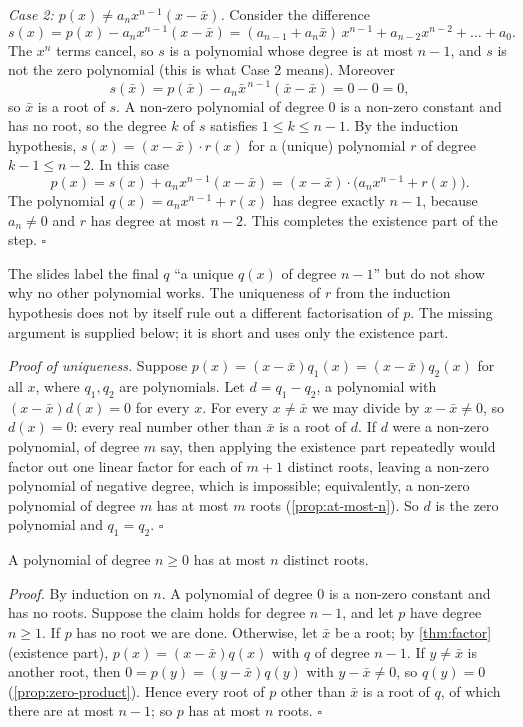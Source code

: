 \emph{Case 2: $p(x)\ne a_nx^{n-1}(x-\bar x)$.} Consider the difference
\[
s(x)=p(x)-a_nx^{n-1}(x-\bar x)=(a_{n-1}+a_n\bar x)\,x^{n-1}+a_{n-2}x^{n-2}+\dots+a_0.
\]
The $x^n$ terms cancel, so $s$ is a polynomial whose degree is at most $n-1$, and $s$ is not the zero polynomial (this is
what Case 2 means). Moreover
\[
s(\bar x)=p(\bar x)-a_n\bar x^{\,n-1}(\bar x-\bar x)=0-0=0,
\]
so $\bar x$ is a root of $s$. A non-zero polynomial of degree $0$ is a non-zero constant and has no root, so the degree
$k$ of $s$ satisfies $1\le k\le n-1$. By the induction hypothesis, $s(x)=(x-\bar x)\cdot r(x)$ for a (unique) polynomial
$r$ of degree $k-1\le n-2$. In this case
\[
p(x)=s(x)+a_nx^{n-1}(x-\bar x)=(x-\bar x)\cdot\big(a_nx^{n-1}+r(x)\big).
\]
The polynomial $q(x)=a_nx^{n-1}+r(x)$ has degree exactly $n-1$, because $a_n\ne0$ and $r$ has degree at most $n-2$. This
completes the existence part of the step. \hfill$\square$

\begin{sourcenote}
The slides label the final $q$ ``a unique $q(x)$ of degree $n-1$'' but do not show why no other polynomial works. The
uniqueness of $r$ from the induction hypothesis does not by itself rule out a different factorisation of $p$. The missing
argument is supplied below; it is short and uses only the existence part.
\end{sourcenote}

\emph{Proof of uniqueness.} Suppose $p(x)=(x-\bar x)q_1(x)=(x-\bar x)q_2(x)$ for all $x$, where $q_1,q_2$ are polynomials.
Let $d=q_1-q_2$, a polynomial with $(x-\bar x)d(x)=0$ for every $x$. For every $x\ne\bar x$ we may divide by $x-\bar x\ne0$,
so $d(x)=0$: every real number other than $\bar x$ is a root of $d$. If $d$ were a non-zero polynomial, of degree $m$ say,
then applying the existence part repeatedly would factor out one linear factor for each of $m+1$ distinct roots, leaving a
non-zero polynomial of negative degree, which is impossible; equivalently, a non-zero polynomial of degree $m$ has at most
$m$ roots (\cref{prop:at-most-n}). So $d$ is the zero polynomial and $q_1=q_2$. \hfill$\square$

\begin{proposition}
A polynomial of degree $n\ge0$ has at most $n$ distinct roots.
\end{proposition}
\emph{Proof.} By induction on $n$. A polynomial of degree $0$ is a non-zero constant and has no roots. Suppose the claim holds
for degree $n-1$, and let $p$ have degree $n\ge1$. If $p$ has no root we are done. Otherwise, let $\bar x$ be a root; by
\cref{thm:factor} (existence part), $p(x)=(x-\bar x)q(x)$ with $q$ of degree $n-1$. If $y\ne\bar x$ is another root, then
$0=p(y)=(y-\bar x)q(y)$ with $y-\bar x\ne0$, so $q(y)=0$ (\cref{prop:zero-product}). Hence every root of $p$ other than
$\bar x$ is a root of $q$, of which there are at most $n-1$; so $p$ has at most $n$ roots. \hfill$\square$

